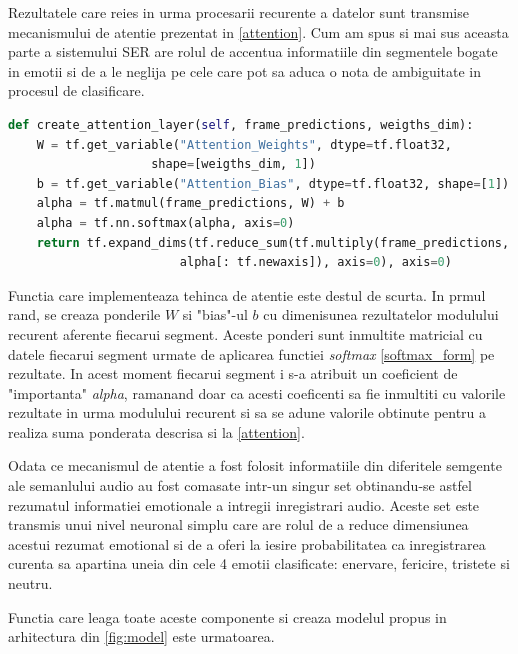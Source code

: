 \documentclass[a4paper,12pt]{book}
\begin{document}
		Rezultatele care reies in urma procesarii recurente a datelor sunt transmise mecanismului de atentie prezentat in \ref{attention}. Cum am spus si mai sus aceasta parte a sistemului SER are rolul de accentua informatiile din segmentele bogate in emotii si de a le neglija pe cele care pot sa aduca o nota de ambiguitate in procesul de clasificare. \par
		
		\begin{lstlisting}[language=Python, caption={Metoda care implementeaza mecanismul de atentie, \ref{attention}.}]	
def create_attention_layer(self, frame_predictions, weigths_dim):
	W = tf.get_variable("Attention_Weights", dtype=tf.float32, 
					shape=[weigths_dim, 1])
	b = tf.get_variable("Attention_Bias", dtype=tf.float32, shape=[1])	
	alpha = tf.matmul(frame_predictions, W) + b
	alpha = tf.nn.softmax(alpha, axis=0)
	return tf.expand_dims(tf.reduce_sum(tf.multiply(frame_predictions, 
						alpha[: tf.newaxis]), axis=0), axis=0)		\end{lstlisting}
		Functia care implementeaza tehinca de atentie este destul de scurta. In prmul rand, se creaza ponderile $W$ si "bias"-ul $b$ cu dimenisunea rezultatelor modulului recurent aferente fiecarui segment. Aceste ponderi sunt inmultite matricial cu datele fiecarui segment urmate de aplicarea functiei \textit{softmax} \ref{softmax_form} pe rezultate. In acest moment fiecarui segment i s-a atribuit un coeficient de "importanta" \textit{alpha}, ramanand doar ca acesti coeficenti sa fie inmultiti cu valorile rezultate in urma modulului recurent si sa se adune valorile obtinute pentru a realiza suma ponderata descrisa si la  \ref{attention}. \par
		
		Odata ce mecanismul de atentie a fost folosit informatiile din diferitele semgente ale semanlului audio au fost comasate intr-un singur set obtinandu-se astfel rezumatul informatiei emotionale a intregii inregistrari audio. Aceste set este transmis unui nivel neuronal simplu care are rolul de a reduce dimensiunea acestui rezumat emotional si de a oferi la iesire probabilitatea ca inregistrarea curenta sa apartina uneia din cele 4 emotii clasificate: enervare, fericire, tristete si neutru. \par
		
		Functia care leaga toate aceste componente si creaza modelul propus in arhitectura din \ref{fig:model} este urmatoarea.
		
\end{document}
